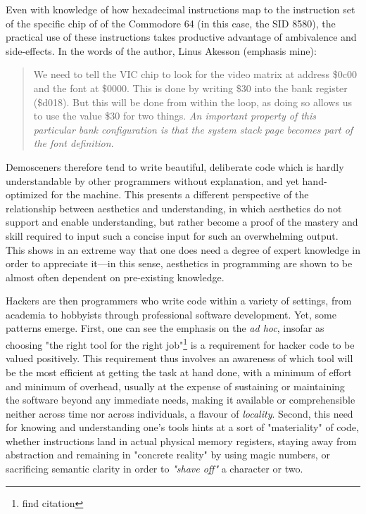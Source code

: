 Even with knowledge of how hexadecimal instructions map to the instruction set of the specific chip of of the Commodore 64 (in this case, the SID 8580), the practical use of these instructions takes productive advantage of ambivalence and side-effects. In the words of the author, Linus Akesson (emphasis mine):

\begin{quote}
  We need to tell the VIC chip to look for the video matrix at address \$0c00 and the font at \$0000. This is done by writing \$30 into the bank register (\$d018). But this will be done from within the loop, as doing so allows us to use the value \$30 for two things. \emph{An important property of this particular bank configuration is that the system stack page becomes part of the font definition}.
\end{quote}

Demosceners therefore tend to write beautiful, deliberate code which is hardly understandable by other programmers without explanation, and yet hand-optimized for the machine. This presents a different perspective of the relationship between aesthetics and understanding, in which aesthetics do not support and enable understanding, but rather become a proof of the mastery and skill required to input such a concise input for such an overwhelming output. This shows in an extreme way that one does need a degree of expert knowledge in order to appreciate it—in this sense, aesthetics in programming are shown to be almost often dependent on pre-existing knowledge.

\vspace*{1\baselineskip}

Hackers are then programmers who write code within a variety of settings, from academia to hobbyists through professional software development. Yet, some patterns emerge. First, one can see the emphasis on the \emph{ad hoc}, insofar as choosing "the right tool for the right job"\footnote{find citation} is a requirement for hacker code to be valued positively. This requirement thus involves an awareness of which tool will be the most efficient at getting the task at hand done, with a minimum of effort and minimum of overhead, usually at the expense of sustaining or maintaining the software beyond any immediate needs, making it available or comprehensible neither across time nor across individuals, a flavour of \emph{locality}. Second, this need for knowing and understanding one's tools hints at a sort of "materiality" of code, whether instructions land in actual physical memory registers, staying away from abstraction and remaining in "concrete reality" by using magic numbers, or sacrificing semantic clarity in order to \emph{"shave off"} a character or two.

